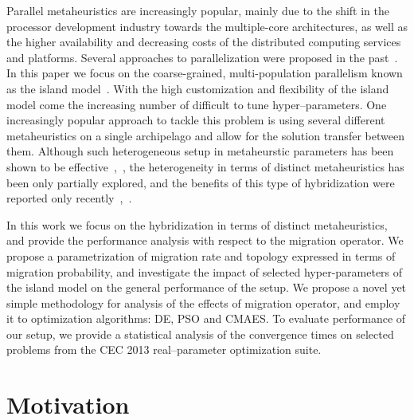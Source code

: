 \documentclass{sig-alternate}
\begin{document}

Parallel metaheuristics are increasingly popular, mainly due to the shift in the processor development industry towards the multiple-core architectures, as well as the higher availability and decreasing costs of the distributed computing services and platforms.
Several approaches to parallelization were proposed in the past~\cite{cantu1998survey}.%
In this paper we focus on the coarse-grained, multi-population parallelism known as the island model~\cite{cantu1999topologies}.
With the high customization and flexibility of the island model come the increasing number of difficult to tune hyper--parameters.
One increasingly popular approach to tackle this problem is using several different metaheuristics on a single archipelago and allow for the solution transfer between them.
Although such heterogeneous setup in metaheurstic parameters has been shown to be effective~\cite{jjmorelo2014pool},~\cite{gong2011}, the heterogeneity in terms of distinct metaheuristics has been only partially explored, and the benefits of this type of hybridization were reported only recently~\cite{izzo2012},~\cite{thiago2014}.

In this work we focus on the hybridization in terms of distinct metaheuristics, and provide the performance analysis with respect to the migration operator.
We propose a parametrization of migration rate and topology expressed in terms of migration probability, and investigate the impact of selected hyper-parameters of the island model on the general performance of the setup.
We propose a novel yet simple methodology for analysis of the effects of migration operator, and employ it to optimization algorithms: DE, PSO and CMAES.
To evaluate performance of our setup, we provide a statistical analysis of the convergence times on selected problems from the CEC 2013 real--parameter optimization suite.

\section{Motivation}
\end{document}
